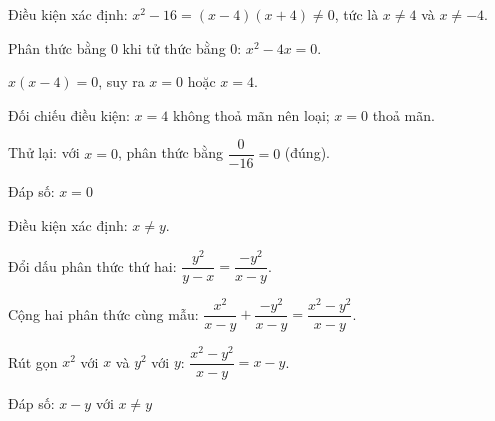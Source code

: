 \begin{problem}[8DS-PS-013]
Điều kiện xác định: $x^2 - 16 = (x - 4)(x + 4) \neq 0$, tức là $x \neq 4$ và $x \neq -4$.

Phân thức bằng $0$ khi tử thức bằng $0$: $x^2 - 4x = 0$.

$x(x - 4) = 0$, suy ra $x = 0$ hoặc $x = 4$.

Đối chiếu điều kiện: $x = 4$ không thoả mãn nên loại; $x = 0$ thoả mãn.

Thử lại: với $x = 0$, phân thức bằng $\dfrac{0}{-16} = 0$ (đúng).

Đáp số: $x = 0$
\end{problem}

\begin{problem}[8DS-PS-003]
Điều kiện xác định: $x \neq y$.

Đổi dấu phân thức thứ hai: $\dfrac{y^2}{y - x} = \dfrac{-y^2}{x - y}$.

Cộng hai phân thức cùng mẫu: $\dfrac{x^2}{x - y} + \dfrac{-y^2}{x - y} = \dfrac{x^2 - y^2}{x - y}$.

Rút gọn $x^2$ với $x$ và $y^2$ với $y$: $\dfrac{x^2 - y^2}{x - y} = x - y$.

Đáp số: $x - y$ với $x \neq y$
\end{problem}
